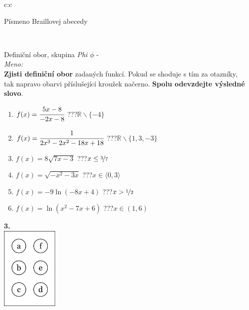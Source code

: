 \documentclass[10pt]{report}
\begin{document}
\begin{tabular}{c:c}
\begin{minipage}[c][99mm][t]{0.49\linewidth}
\begin{center}
\begin{minipage}{0.20\linewidth}
\begin{center}
{\small Písmeno Braillovej abecedy}
\end{center}
\end{minipage}
\end{center}
\end{minipage}
\\ \hdashline
\begin{minipage}[c][99mm][t]{0.49\linewidth}
\begin{center}
\vspace{7mm}
{\huge Definiční obor, skupina \textit{Phi $\phi$} -}\\[4.5mm]
\textit{Meno:}\phantom{xxxxxxxxxxxxxxxxxxxxxxxxxxxxxxxxxxxxxxxxxxxxxxxxxxxxxxxxxxxxxxxxx}\\[3.5mm]
\textbf{Zjisti definiční obor} zadaných funkcí. Pokud se shoduje s tím za otazníky,\\tak napravo obarvi příslušející kroužek načerno. \textbf{Spolu odevzdejte výsledné slovo}.\\[3mm]
\begin{minipage}{0.77\linewidth}
\begin{center}
\begin{varwidth}{\textwidth}
\begin{enumerate}
\normalsize
\item $f(x)=\cfrac{5x-8}{-2x-8}$\quad \dotfill\; ???\;\dotfill \quad $\mathbb{R}\smallsetminus\{-4\}$
\item $f(x)=\cfrac{1}{2x^3-2x^2-18x+18}$\quad \dotfill\; ???\;\dotfill \quad $\mathbb{R}\smallsetminus\{1,3,-3\}$
\item $f(x)=8\sqrt{7x-3}$\quad \dotfill\; ???\;\dotfill \quad $x\leq\nicefrac{3}{7}$
\item $f(x)=\sqrt{-x^2-3x}$\quad \dotfill\; ???\;\dotfill \quad $x\in\langle0 , 3\rangle$
\item $f(x)=-9\ln{(-8x+4)}$\quad \dotfill\; ???\;\dotfill \quad $x>\nicefrac{1}{2}$
\item $f(x)=\ln{(x^2-7x+6)}$\quad \dotfill\; ???\;\dotfill \quad $x\in(1 , 6)$
\end{enumerate}
\end{varwidth}
\end{center}
\end{minipage}
\begin{minipage}{0.20\linewidth}
\begin{center}
{\Huge\bfseries 3.} \\[2mm]
\includegraphics[height=40mm]{../images/braille.png}

\end{center}
\end{minipage}
\end{center}
\end{minipage}
\end{tabular}
\end{document}
